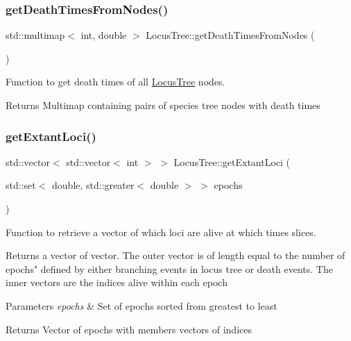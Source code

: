 \subsubsection{\texorpdfstring{getDeathTimesFromNodes()}{getDeathTimesFromNodes()}}
{\footnotesize\ttfamily std\+::multimap$<$ int, double $>$ Locus\+Tree\+::get\+Death\+Times\+From\+Nodes (\begin{DoxyParamCaption}{ }\end{DoxyParamCaption})}



Function to get death times of all \mbox{\hyperlink{class_locus_tree}{Locus\+Tree}} nodes. 

\begin{DoxyReturn}{Returns}
Multimap containing pairs of species tree nodes with death times 
\end{DoxyReturn}
\mbox{\label{class_locus_tree_a73bb95535ffc07ef6c8ad5978a0b2a06}} 
\subsubsection{\texorpdfstring{getExtantLoci()}{getExtantLoci()}}
{\footnotesize\ttfamily std\+::vector$<$ std\+::vector$<$ int $>$ $>$ Locus\+Tree\+::get\+Extant\+Loci (\begin{DoxyParamCaption}\item[{std\+::set$<$ double, std\+::greater$<$ double $>$ $>$}]{epochs }\end{DoxyParamCaption})}



Function to retrieve a vector of which loci are alive at which times slices. 

Returns a vector of vector. The outer vector is of length equal to the number of epochs" defined by either branching events in locus tree or death events. The inner vectors are the indices alive within each epoch


\begin{DoxyParams}{Parameters}
{\em epochs} & Set of epochs sorted from greatest to least \\
\hline
\end{DoxyParams}
\begin{DoxyReturn}{Returns}
Vector of epochs with members vectors of indices 
\end{DoxyReturn}
\mbox{\label{class_locus_tree_abf6fca34687f1cbe128caae5d1ac737f}} 
